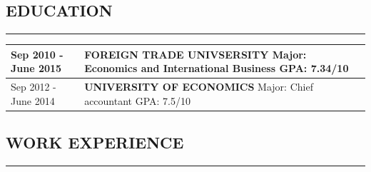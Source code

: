 \documentclass[12pt]{article}
\begin{document}
	
	
	
	\vspace*{-0.5cm}
	\subsection*{EDUCATION}
	\vspace*{-0.25cm}
	\hrule
	\vspace*{-0.25cm}
	
	\begin{table}[th]
		\vspace*{-0.25cm}
		\renewcommand{\arraystretch}{2}
		\begin{tabularx}{\linewidth}{p{5cm}>{\raggedright\arraybackslash}X}
			Sep 2010 - June 2015 & \textbf{FOREIGN TRADE UNIVSERSITY}\linebreak
									Major: Economics and International Business \linebreak
									GPA: 7.34/10 \\ \hline
			Sep 2012 - June 2014 & \textbf{UNIVERSITY OF ECONOMICS}\linebreak
									Major: Chief accountant\linebreak
									GPA: 7.5/10 \\ \hline
		\end{tabularx}
	\end{table}
	
	
	
	\vspace*{-0.5cm}
	\subsection*{WORK EXPERIENCE}
	\vspace*{-0.25cm}
	\hrule
	\vspace*{-0.25cm}
	
\end{document}
